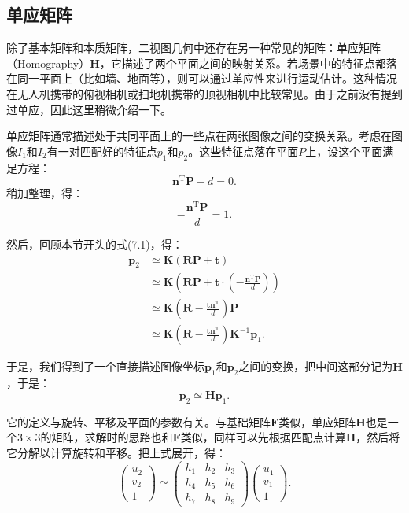 \subsection{单应矩阵}
除了基本矩阵和本质矩阵，二视图几何中还存在另一种常见的矩阵：单应矩阵（Homography）$\bm{H}$，它描述了两个平面之间的映射关系。若场景中的特征点都落在同一平面上（比如墙、地面等），则可以通过单应性来进行运动估计。这种情况在无人机携带的俯视相机或扫地机携带的顶视相机中比较常见。由于之前没有提到过单应，因此这里稍微介绍一下。

单应矩阵通常描述处于共同平面上的一些点在两张图像之间的变换关系。考虑在图像$I_{1}$和$I_{2}$有一对匹配好的特征点$p_{1}$和$p_{2}$。这些特征点落在平面$P$上，设这个平面满足方程：
\begin{equation}
\bm{n}^\mathrm{T} \bm{P} + d = 0.
\end{equation}
稍加整理，得：
\begin{equation}
- \frac{\bm{n}^\mathrm{T} \bm{P} }{d} = 1.
\end{equation}

然后，回顾本节开头的式(7.1)，得：
\begin{align*}
\bm{p}_2 &\simeq \bm{K} ( \bm{R} \bm{P} + \bm{t} ) \\ 
&\simeq \bm{K} \left( \bm{R} \bm{P} + \bm{t} \cdot (- \frac{\bm{n}^\mathrm{T} \bm{P} }{d}) \right) \\
&\simeq \bm{K} \left( \bm{R} - \frac{\bm{t} \bm{n}^\mathrm{T} }{d} \right) \bm{P} \\ 
&\simeq \bm{K} \left( \bm{R} - \frac{\bm{t} \bm{n}^\mathrm{T} }{d} \right) \bm{K}^{-1} \bm{p}_1.
\end{align*}

于是，我们得到了一个直接描述图像坐标$\bm{p}_1$和$\bm{p}_2$之间的变换，把中间这部分记为$\bm{H}$，于是：
\begin{equation}
\bm{p}_2 \simeq \bm{H} \bm{p}_1.
\end{equation}

它的定义与旋转、平移及平面的参数有关。与基础矩阵$\bm{F}$类似，单应矩阵$\bm{H}$也是一个$3 \times 3$的矩阵，求解时的思路也和$\bm{F}$类似，同样可以先根据匹配点计算$\bm{H}$，然后将它分解以计算旋转和平移。把上式展开，得：
\begin{equation}
\begin{pmatrix} 
u_{2}\\v_{2}\\1
\end{pmatrix}
\simeq
\begin{pmatrix}
 h_{1} & h_{2} & h_{3}\\ 
 h_{4} & h_{5} & h_{6}\\ 
 h_{7} & h_{8} & h_{9} 
\end{pmatrix}
\begin{pmatrix} 
u_{1}\\v_{1}\\1
\end{pmatrix}.
\end{equation}

